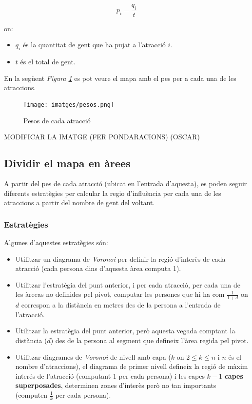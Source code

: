 \documentclass[12pt]{article}
\begin{document}
$$p_{i} = \frac{q_{i}}{t}$$

on:
\begin{itemize}
	\item $q_{i}$ és la quantitat de gent que ha pujat a l'atracció $i$.
	\item $t$ és el total de gent.
\end{itemize}

En la següent \textit{Figura \ref{fig:mapa_areas}} es pot veure el mapa amb el pes per a cada una de les atraccions.

\begin{figure}[H]
	\centering
	\texttt{[image: imatges/pesos.png]}\par\vspace{1cm}
	\caption{Pesos de cada atracció}
	\label{fig:mapa_areas}
\end{figure}

MODIFICAR LA IMATGE (FER PONDARACIONS) (OSCAR)

\subsection{Dividir el mapa en àrees \label{arees}}
A partir del pes de cada atracció (ubicat en l'entrada d'aquesta), es poden seguir diferents estratègies per calcular la regio d'influència per cada una de les atraccions a partir del nombre de gent del voltant.

\subsubsection{Estratègies}
Algunes d'aquestes estratègies són:
\begin{itemize}
	\item Utilitzar un diagrama de \textit{Voronoi} per definir la regió d'interès de cada atracció (cada persona dins d'aquesta àrea computa 1).
	\item Utilitzar l'estratègia del punt anterior, i per cada atracció, per cada una de les àreeas no definides pel pivot, computar les persones que hi ha com $\frac{1}{1+d}$ on $d$ correspon a la distància en metres des de la persona a l'entrada de l'atracció.
	\item Utilitzar la estratègia del punt anterior, però aquesta vegada comptant la distància ($d$) des de la persona al segment que defineix l'àrea regida pel pivot.
	\item Utilitzar diagrames de \textit{Voronoi} de nivell amb capa ($k$ on $2 \le k \le n$ i $n$ és el nombre d'atraccions), el diagrama de primer nivell defineix la regió de màxim interés de l'atracció (computant 1 per cada persona) i les capes $k-1$ \textbf{capes superposades}, determinen zones d'interès però no tan importants (computen $\frac{1}{k}$ per cada persona).
\end{itemize}
\end{document}
